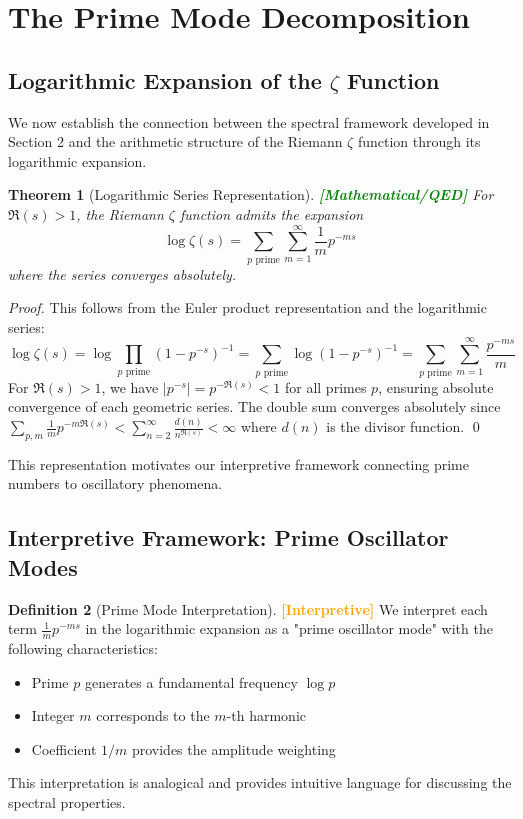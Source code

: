 \documentclass[12pt]{article}
\theoremstyle{plain}
\newtheorem{theorem}{Theorem}[section]
\theoremstyle{definition}
\newtheorem{definition}[theorem]{Definition}
\newcommand{\statusmath}{\textcolor{green}{\textbf{[Mathematical/QED]}}}
\newcommand{\statusinterp}{\textcolor{orange}{\textbf{[Interpretive]}}}
\begin{document}
\section{The Prime Mode Decomposition}

\subsection{Logarithmic Expansion of the $\zeta$ Function}

We now establish the connection between the spectral framework developed in Section 2 and the arithmetic structure of the Riemann $\zeta$ function through its logarithmic expansion.

\begin{theorem}[Logarithmic Series Representation] \statusmath
For $\Re(s) > 1$, the Riemann $\zeta$ function admits the expansion
$$
\log \zeta(s) = \sum_{p \text{ prime}}\sum_{m=1}^{\infty} \frac{1}{m} p^{-ms}
$$
where the series converges absolutely.
\end{theorem}

\begin{proof}
This follows from the Euler product representation and the logarithmic series:
$$
\log \zeta(s) = \log \prod_{p \text{ prime}} (1-p^{-s})^{-1} = \sum_{p \text{ prime}} \log(1-p^{-s})^{-1} = \sum_{p \text{ prime}} \sum_{m=1}^{\infty} \frac{p^{-ms}}{m}
$$
For $\Re(s) > 1$, we have $|p^{-s}| = p^{-\Re(s)} < 1$ for all primes $p$, ensuring absolute convergence of each geometric series. The double sum converges absolutely since $\sum_{p,m} \frac{1}{m}p^{-m\Re(s)} < \sum_{n=2}^\infty \frac{d(n)}{n^{\Re(s)}} < \infty$ where $d(n)$ is the divisor function. \qed
\end{proof}

This representation motivates our interpretive framework connecting prime numbers to oscillatory phenomena.

\subsection{Interpretive Framework: Prime Oscillator Modes}

\begin{definition}[Prime Mode Interpretation] \statusinterp
We interpret each term $\frac{1}{m}p^{-ms}$ in the logarithmic expansion as a "prime oscillator mode" with the following characteristics:
\begin{itemize}
\item Prime $p$ generates a fundamental frequency $\log p$
\item Integer $m$ corresponds to the $m$-th harmonic
\item Coefficient $1/m$ provides the amplitude weighting
\end{itemize}
This interpretation is analogical and provides intuitive language for discussing the spectral properties.
\end{definition}
\end{document}
